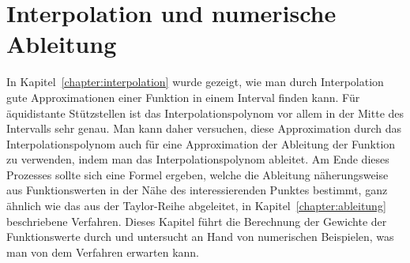 %
%
%
\chapter{Interpolation und numerische Ableitung\label{chapter:interdiff}}
\rhead{}
\begin{refsection}

{\parindent0pt
In} Kapitel~\ref{chapter:interpolation} wurde gezeigt, wie man durch
Interpolation gute Approximationen einer Funktion in einem Interval
finden kann.
Für äquidistante Stützstellen ist das Interpolationspolynom vor allem in
der Mitte des Intervalls sehr genau.
Man kann daher versuchen, diese Approximation durch das Interpolationspolynom
auch für eine Approximation der Ableitung der Funktion zu verwenden, indem
man das Interpolationspolynom ableitet.
Am Ende dieses Prozesses sollte sich eine Formel ergeben, welche die
Ableitung näherungsweise aus Funktionswerten in der Nähe des
interessierenden Punktes bestimmt, ganz ähnlich wie das aus der
Taylor-Reihe abgeleitet, in Kapitel~\ref{chapter:ableitung} beschriebene
Verfahren.
Dieses Kapitel führt die Berechnung der Gewichte der Funktionswerte durch
und untersucht an Hand von numerischen Beispielen, was man von dem Verfahren
erwarten kann.






\printbibliography[heading=subbibliography]
\end{refsection}
